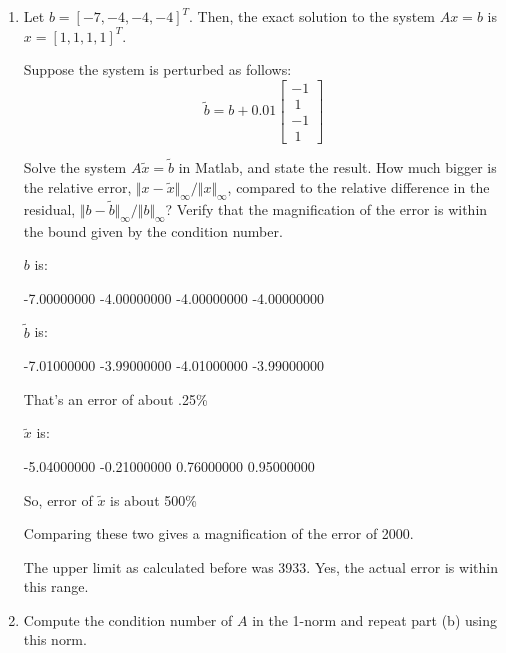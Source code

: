 \documentclass{article}
\begin{document}
\begin{enumerate}
\begin{enumerate}
\begin{mdframed}[style=MyFrame]
\end{mdframed}

\medskip

\item Let  $b = [-7,-4,-4,-4]^T$.  Then, the exact solution to the system $Ax=b$ is $x=[1,1,1,1]^T$.

Suppose the system is perturbed as follows:
\begin{equation*}
\tilde{b} = b + 0.01 \begin{bmatrix} -1\\~1\\-1\\~1 \end{bmatrix}
\end{equation*}

Solve the system $A \tilde{x} = \tilde{b}$ in Matlab, and state the result. How much bigger is the relative error, $\Vert x-\tilde x \Vert_{\infty} / \Vert x \Vert_{\infty}$, compared to the relative difference in the residual, $\displaystyle \Vert b - \tilde{b} \Vert_{\infty}/\Vert b \Vert_{\infty}$? Verify that the magnification of the error is within the bound given by the condition number. \newline

\begin{mdframed}[style=MyFrame]

$b$ is:

-7.00000000
-4.00000000
-4.00000000
-4.00000000

$\tilde{b}$ is:

-7.01000000
-3.99000000
-4.01000000
-3.99000000

That's an error of about .25\%

$\tilde{x}$ is:

-5.04000000
-0.21000000
0.76000000
0.95000000

So, error of $\tilde{x}$ is about 500\%

Comparing these two gives a magnification of the error of 2000.

The upper limit as calculated before was 3933. Yes, the actual error is within this range.

\end{mdframed}

\item Compute the condition number of $A$ in the 1-norm and repeat part (b) using this norm. \newline

\begin{mdframed}[style=MyFrame]


\end{mdframed}
\end{enumerate}
\end{enumerate}
\end{document}
